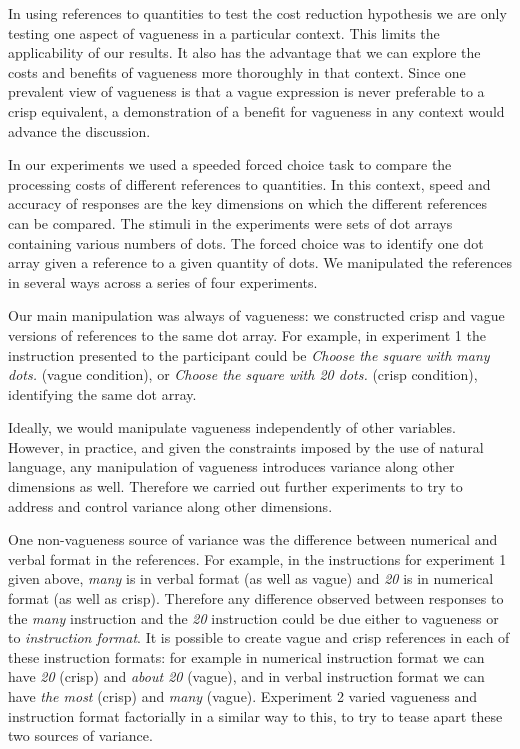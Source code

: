 \documentclass[graybox,envcountchap,sectrefs%
,footinfo
]{svmono}
\begin{document}
In using references to quantities to test the cost reduction hypothesis we are only testing one aspect of vagueness in a particular context. This limits the applicability of our results. It also has the advantage that we can explore the costs and benefits of vagueness more thoroughly in that context. Since one prevalent view of vagueness is that a vague expression is never preferable to a crisp equivalent, a demonstration of a benefit for vagueness in any context would advance the discussion.

In our experiments we used a speeded forced choice task to compare the processing costs of different references to quantities. In this context, speed and accuracy of responses are the key dimensions on which the different references can be compared. The stimuli in the experiments were sets of dot arrays containing various numbers of dots. The forced choice was to identify one dot array given a reference to a given quantity of dots. We manipulated the references in several ways across a series of four experiments. 

Our main manipulation was always of vagueness: we constructed crisp and vague versions of references to the same dot array. For example, in experiment 1 the instruction presented to the participant could be \emph{Choose the square with many dots.} (vague condition), or \emph{Choose the square with 20 dots.} (crisp condition), identifying the same dot array.

Ideally, we would manipulate vagueness independently of other variables. However, in practice, and given the constraints imposed by the use of natural language, any manipulation of vagueness introduces variance along other dimensions as well. Therefore we carried out further experiments to try to address and control variance along other dimensions. 

One non-vagueness source of variance was the difference between numerical and verbal format in the references. For example, in the instructions for experiment 1 given above, \emph{many} is in verbal format (as well as vague) and \emph{20} is in numerical format (as well as crisp). Therefore any difference observed between responses to the \emph{many} instruction and the \emph{20} instruction could be due either to vagueness or to {\sl instruction format}. It is possible to create vague and crisp references in each of these instruction formats: for example in numerical instruction format we can have \emph{20} (crisp) and \emph{about 20} (vague), and in verbal instruction format we can have \emph{the most} (crisp) and \emph{many} (vague). Experiment 2 varied vagueness and instruction format factorially in a similar way to this, to try to tease apart these two sources of variance.
\end{document}
